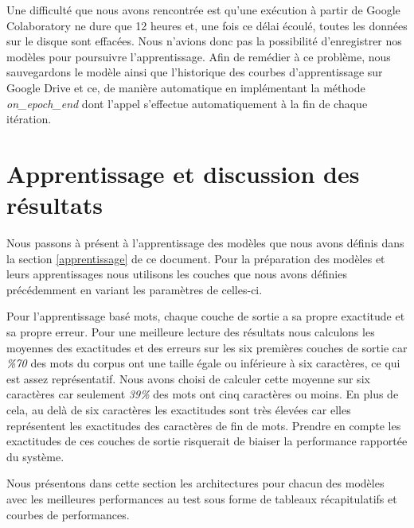 Une difficulté que nous avons rencontrée est qu'une exécution à partir de Google Colaboratory ne dure que 12 heures et, une fois ce délai écoulé, toutes les données sur le disque sont effacées. Nous n'avions donc pas la possibilité d'enregistrer nos modèles pour poursuivre l'apprentissage. Afin de remédier à ce problème, nous sauvegardons le modèle ainsi que l'historique des courbes d'apprentissage sur Google Drive et ce, de manière automatique en implémentant la méthode \textit{on\_epoch\_end} dont l'appel s'effectue automatiquement à la fin de chaque itération.


\section{Apprentissage et discussion des résultats}
Nous passons à présent à l'apprentissage des modèles que nous avons définis dans la section \ref{apprentissage} de ce document. Pour la préparation des modèles et leurs apprentissages nous utilisons les couches que nous avons définies précédemment en variant les paramètres de celles-ci.

Pour l'apprentissage basé mots, chaque couche de sortie a sa propre exactitude et sa propre erreur. Pour une meilleure lecture des résultats nous calculons les moyennes des exactitudes et des erreurs sur les six premières couches de sortie car \textit{\%70} des mots du corpus ont une taille égale ou inférieure à six caractères, ce qui est assez représentatif. Nous avons choisi de calculer cette moyenne sur six caractères car seulement \textit{39\%} des mots ont cinq caractères ou moins. En plus de cela, au delà de six caractères les exactitudes sont très élevées car elles représentent les exactitudes des caractères de fin de mots. Prendre en compte les exactitudes de ces couches de sortie risquerait de biaiser la performance rapportée du système.

Nous présentons dans cette section les architectures pour chacun des modèles avec les meilleures performances au test sous forme de tableaux récapitulatifs et courbes de performances.

